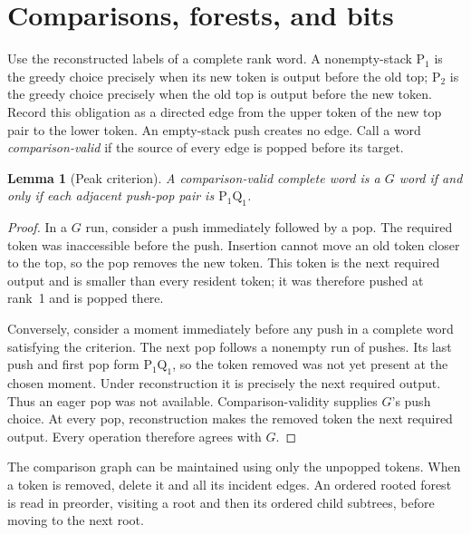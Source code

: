 \documentclass[11pt,a4paper]{article}
\newtheorem{lemma}[theorem]{Lemma}
\theoremstyle{remark}
\newcommand{\PP}{\mathrm{P}}
\newcommand{\QQ}{\mathrm{Q}}
\begin{document}
\section{Comparisons, forests, and bits}\label{sec:forest}

Use the reconstructed labels of a complete rank word. A nonempty-stack
$\PP_1$ is the greedy choice precisely when its new token is output
before the old top; $\PP_2$ is the greedy choice precisely when the old
top is output before the new token. Record this obligation as a directed
edge from the upper token of the new top pair to the lower token.
An empty-stack push creates no edge. Call a word \emph{comparison-valid}
if the source of every edge is popped before its target.

\begin{lemma}[Peak criterion]\label{lem:peak}
A comparison-valid complete word is a $G$ word if and only if each
adjacent push-pop pair is $\PP_1\QQ_1$.
\end{lemma}
\begin{proof}
In a $G$ run, consider a push immediately followed by a pop. The required
token was inaccessible before the push. Insertion cannot move an old
token closer to the top, so the pop removes the new token. This token
is the next required output and is smaller than every resident token;
it was therefore pushed at rank~1 and is popped there.

Conversely, consider a moment immediately before any push in a complete
word satisfying the criterion. The next pop follows a nonempty run of
pushes. Its last push and first pop form $\PP_1\QQ_1$, so the token
removed was not yet present at the chosen moment. Under reconstruction
it is precisely the next required output. Thus an eager pop was not
available. Comparison-validity supplies $G$'s push choice. At every pop,
reconstruction makes the removed token the next required output.
Every operation therefore agrees with $G$.
\end{proof}

The comparison graph can be maintained using only the unpopped tokens.
When a token is removed, delete it and all its incident edges. An ordered
rooted forest is read in preorder, visiting a root and then its ordered
child subtrees, before moving to the next root.
\end{document}
